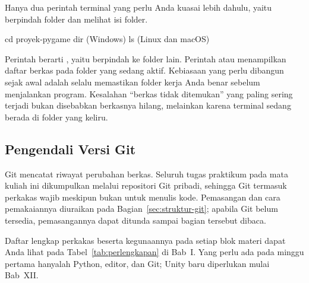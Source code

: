 Hanya dua perintah terminal yang perlu Anda kuasai lebih dahulu, yaitu
berpindah folder dan melihat isi folder.

\begin{kodekeluaran}
cd proyek-pygame\code
dir          (Windows)
ls           (Linux dan macOS)
\end{kodekeluaran}

Perintah  berarti , yaitu berpindah ke
folder lain. Perintah  atau  menampilkan daftar berkas pada
folder yang sedang aktif. Kebiasaan yang perlu dibangun sejak awal adalah
selalu memastikan folder kerja Anda benar sebelum menjalankan program.
Kesalahan ``berkas tidak ditemukan'' yang paling sering terjadi bukan
disebabkan berkasnya hilang, melainkan karena terminal sedang berada di folder
yang keliru.

\subsection{Pengendali Versi Git}

Git mencatat riwayat perubahan berkas. Seluruh tugas praktikum pada mata
kuliah ini dikumpulkan melalui repositori Git pribadi, sehingga Git termasuk
perkakas wajib meskipun bukan untuk menulis kode. Pemasangan dan cara
pemakaiannya diuraikan pada Bagian~\ref{sec:struktur-git}; apabila Git belum
tersedia, pemasangannya dapat ditunda sampai bagian tersebut dibaca.

\begin{catatabox}
Daftar lengkap perkakas beserta kegunaannya pada setiap blok materi dapat
Anda lihat pada Tabel~\ref{tab:perlengkapan} di Bab~I. Yang perlu ada pada
minggu pertama hanyalah Python, editor, dan Git; Unity baru diperlukan mulai
Bab~XII.
\end{catatabox}
